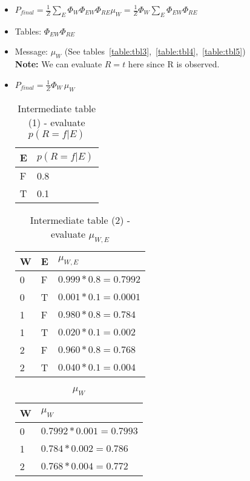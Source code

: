 \documentclass{article}
\begin{document}
\begin{enumerate}[label=(\alph*)]
\begin{enumerate}[label=\roman*.]
\begin{enumerate}[label=\alph*.]
\begin{itemize}

\item $P_{final}=\frac{1}{Z}\sum_{E}\Phi_{W}\Phi_{EW}\Phi_{RE}\mu_W = \frac{1}{Z}\Phi_{W}\sum_{E}\Phi_{EW}\Phi_{RE}$

\item Tables: $\Phi_{EW}\Phi_{RE}$

\item Message: $\mu_{W}$ (See tables~\ref{table:tbl3},~\ref{table:tbl4},~\ref{table:tbl5}) \\
\textbf{Note:} We can evaluate $R=t$ here since R is observed.

\item  $P_{final}=\frac{1}{Z}\Phi_{W}\,\mu_{W}$

\begin{table}[h]
\centering
\caption{Intermediate table (1) - evaluate $p(R=f|E)$}
\label{table:tbl12}
\begin{tabular}{|l|l|}
\hline
 E & $p(R=f|E)$   \\
\hline \hline
 F & 0.8  \\
 T & 0.1  \\
\hline
\end{tabular}
\end{table}

\begin{table}[h]
\centering
\caption{Intermediate table (2) - evaluate $\mu_{W,E}$}
\label{table:tbl13}
\begin{tabular}{|l|l|l|}
\hline
 W &E & $\mu_{W,E}$   \\
\hline \hline
0 & F & $0.999*0.8=0.7992$ \\
0 & T & $0.001*0.1=0.0001$ \\
1 & F & $0.980*0.8=0.784$ \\
1 & T & $0.020*0.1=0.002$ \\
2 & F & $0.960*0.8=0.768$ \\
2 & T & $0.040*0.1=0.004$ \\
\hline
\end{tabular}
\end{table}

\begin{table}[h]
\centering
\caption{$\mu_{W}$}
\label{table:tbl14}
\begin{tabular}{|l|l|}
\hline
 W  & $\mu_{W}$   \\
\hline \hline
0 & $0.7992*0.001=0.7993$ \\
1 & $0.784*0.002=0.786$ \\
2 & $0.768*0.004=0.772$ \\
\hline
\end{tabular}
\end{table}


\end{itemize}
\end{enumerate}
\end{enumerate}
\end{enumerate}
\end{document}
